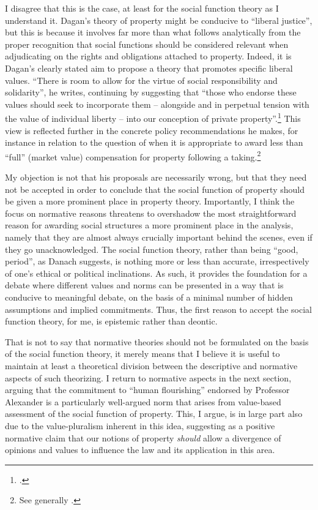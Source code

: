 \documentclass[12pt,a4paper]{book} %
\begin{document}
I disagree that this is the case, at least for the social function theory as I understand it. Dagan's theory of property might be conducive to ``liberal justice'', but this is because it involves far more than what follows analytically from the proper recognition that  social functions should be considered relevant when adjudicating on the rights and obligations attached to property. Indeed, it is Dagan's clearly stated aim to propose a theory that promotes specific liberal values. ``There is room to allow for the virtue of social responsibility and solidarity'', he writes, continuing by suggesting that ``those who endorse these values should seek to incorporate them -- alongside and in perpetual tension with the value of individual liberty -- into our conception of private property''.\footcite[802]{dagan99} This view is reflected further in the concrete policy recommendations he makes, for instance in relation to the question of when it is appropriate to award less than ``full'' (market value) compensation for property following a taking.\footnote{See generally \cite{dagan14b}.}

My objection is not that his proposals are necessarily wrong, but that they need not be accepted in order to conclude that the social function of property should be given a more prominent place in property theory. Importantly, I think the focus on normative reasons threatens to overshadow the most straightforward reason for awarding social structures a more prominent place in the analysis, namely that they are almost always crucially important behind the scenes, even if they go unacknowledged. The social function theory, rather than being ``good, period'', as Danach suggests, is nothing more or less than accurate, irrespectively of one's ethical or political inclinations. As such, it provides the foundation for a debate where different values and norms can be presented in a way that is conducive to meaningful debate, on the basis of a minimal number of hidden assumptions and implied commitments. Thus, the first reason to accept the social function theory, for me, is epistemic rather than deontic.

That is not to say that normative theories should not be formulated on the basis of the social function theory, it merely means that I believe it is useful to maintain at least a theoretical division between the descriptive and normative aspects of such theorizing. I return to normative aspects in the next section, arguing that the commitment to ``human flourishing'' endorsed by Professor Alexander is a particularly well-argued norm that arises from value-based assessment of the social function of property. This, I argue, is in large part also due to the value-pluralism inherent in this idea, suggesting as a positive normative claim that our notions of property {\it should} allow a divergence of opinions and values to influence the law and its application in this area.
\end{document}
